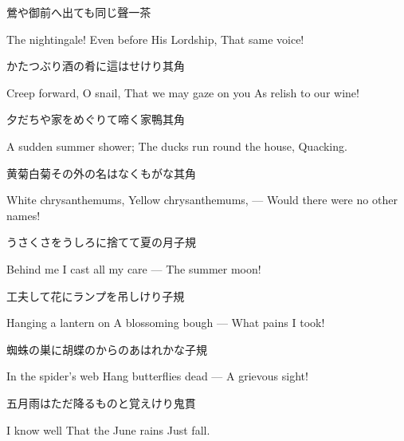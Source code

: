 \begin{haiku}
    {\FH 鶯や御前へ出ても同じ聲}\hfill{\FH 一茶}

    \vin{} The nightingale!
    \vin{} \vin{} Even before His Lordship,
    \vin{} \vin{} \vin{} That same voice!
\end{haiku}

\begin{haiku}
    {\FH かたつぶり酒の肴に這はせけり}\hfill{\FH 其角}

    \vin{} Creep forward, O snail,
    \vin{} \vin{} That we may gaze on you
    \vin{} \vin{} \vin{} As relish to our wine!
\end{haiku}

\begin{haiku}
    {\FH 夕だちや家をめぐりて啼く家鴨}\hfill{\FH 其角}

    \vin{} A sudden summer shower;
    \vin{} \vin{} The ducks run round the house,
    \vin{} \vin{} \vin{} Quacking.
\end{haiku}

\begin{haiku}
    {\FH 黄菊白菊その外の名はなくもがな}\hfill{\FH 其角}

    \vin{} White chrysanthemums,
    \vin{} \vin{} Yellow chrysanthemums, ---
    \vin{} \vin{} \vin{} Would there were no other names!
\end{haiku}

\begin{haiku}
    {\FH うさくさをうしろに捨てて夏の月}\hfill{\FH 子規}

    \vin{} Behind me
    \vin{} \vin{} I cast all my care ---
    \vin{} \vin{} \vin{} The summer moon!
\end{haiku}

\begin{haiku}
    {\FH 工夫して花にランプを吊しけり}\hfill{\FH 子規}

    \vin{} Hanging a lantern on
    \vin{} \vin{} A blossoming bough ---
    \vin{} \vin{} \vin{} What pains I took!
\end{haiku}

\begin{haiku}
    {\FH 蜘蛛の巣に胡蝶のからのあはれかな}\hfill{\FH 子規}

    \vin{} In the spider's web
    \vin{} \vin{} Hang butterflies dead ---
    \vin{} \vin{} \vin{} A grievous sight!
\end{haiku}

\begin{haiku}
    {\FH 五月雨はただ降るものと覚えけり}\hfill{\FH 鬼貫}

    \vin{} I know well
    \vin{} \vin{} That the June rains
    \vin{} \vin{} \vin{} Just fall.
\end{haiku}


